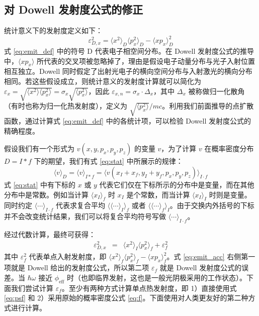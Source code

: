 \subsection{\label{ss:dowell}对 Dowell 发射度公式的修正}
统计意义下的发射度定义如下：
\begin{equation}
\varepsilon_{D,x}^2 = \langle x^2\rangle_D\langle p_x^2\rangle_D-\langle xp_x\rangle_D^2
\label{eq:emit_def}
\end{equation}
式 \ref{eq:emit_def} 中的符号 D 代表电子相空间分布。在 Dowell 发射度公式的推导中，$\langle xp_x\rangle$ 所代表的交叉项被忽略掉了，理由是假设电子动量分布与光子入射位置相互独立。Dowell 同时假定了出射光电子的横向空间分布与入射激光的横向分布相同。若这些假设成立，则统计意义的发射度计算就可以简化为 $\varepsilon_{x} = \sqrt{\langle x^2\rangle\langle p_x^2\rangle}=\sigma_x\sqrt{\langle p_x^2\rangle}$，因此 $\varepsilon_{x,n} = \sigma_x\cdot\Delta_x$，其中 $\Delta_x$ 被称做归一化散角（有时也称为归一化热发射度），定义为 $\sqrt{\langle p_x^2\rangle}/mc$。利用我们前面推导的点扩散函数，通过计算式 \ref{eq:emit_def} 中的各统计项，可以检验 Dowell 发射度公式的精确程度。

假设我们有一个形式为 $v(x,y,p_x,p_y,p_z)$ 的变量 $v$，为了计算 $v$ 在概率密度分布 $D=I*f$ 下的期望，我们有式 \ref{eq:stat} 中所展示的规律：
\begin{equation}
\langle v \rangle_{D} = \langle v\rangle_{I * f} = \langle v(x_I+x_f, y_I+y_f, p_x, p_y, p_z)\rangle_{I\cdot f}
\label{eq:stat}
\end{equation}
式 \ref{eq:stat} 中有下标的 $x$ 或 $y$ 代表它们仅在下标所示的分布中是变量，而在其他分布中是常数。例如当计算 $\langle x_I\rangle_{f}$ 时 $x_I$ 是个常数，而当计算 $\langle x_I\rangle_{I}$ 时则是变量。 同时约定 $\langle\cdots\rangle_{I\cdot f}$ 代表求复合平均 $\langle\langle\cdots\rangle_{I}\rangle_{f}$ 或者 $\langle\langle\cdots\rangle_{f}\rangle_{I}$。由于交换内外括号的下标并不会改变统计结果，我们可以将复合平均符号写做 $\langle\cdots\rangle_{I\cdot f}$。

经过代数计算，最终可获得：
\begin{eqnarray}
\varepsilon_{D, x}^2 &=& \langle x^2\rangle_I\langle p_x^2\rangle_f+\varepsilon_f^2
\label{eq:emit_acc}
\end{eqnarray}
其中 $\varepsilon_f^2$ 代表单点入射发射度，即 $\langle x^2\rangle_f\langle p_x^2\rangle_f-\langle xp_x\rangle_f^2$。式 \ref{eq:emit_acc} 右侧第一项就是 Dowell 给出的发射度公式，所以第二项 $\varepsilon_f$ 就是 Dowell 发射度公式的误差。当 $\hbar\omega$ 接近 $\phi_{\text{eff}}$ 时（也即临界发射，这也是一般光阴极采用的工作状态）。下面我们尝试计算 $\varepsilon_f$。至少有两种方式计算单点热发射度，即 1）直接使用式 \ref{eq:psf} 和 2）采用原始的概率密度公式 \ref{eq:f}。下面使用对人类更友好的第二种方式进行计算。

